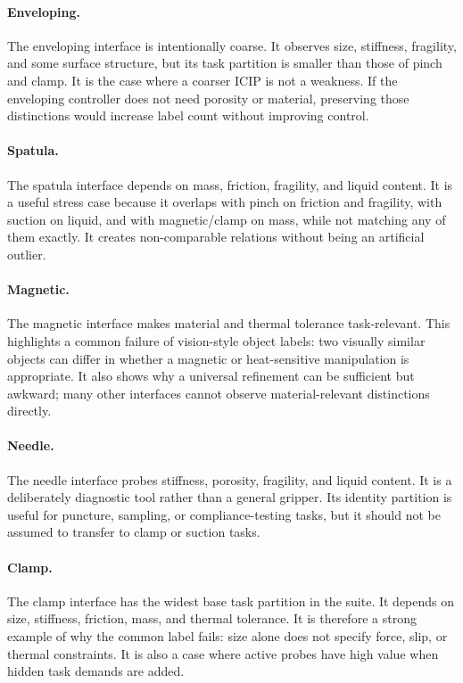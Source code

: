\documentclass{article}
\newcommand{\icip}{\textsc{ICIP}}
\begin{document}
\paragraph{Enveloping.}
The enveloping interface is intentionally coarse.
It observes size, stiffness, fragility, and some surface structure, but its task partition is smaller than those of pinch and clamp.
It is the case where a coarser \icip{} is not a weakness.
If the enveloping controller does not need porosity or material, preserving those distinctions would increase label count without improving control.

\paragraph{Spatula.}
The spatula interface depends on mass, friction, fragility, and liquid content.
It is a useful stress case because it overlaps with pinch on friction and fragility, with suction on liquid, and with magnetic/clamp on mass, while not matching any of them exactly.
It creates non-comparable relations without being an artificial outlier.

\paragraph{Magnetic.}
The magnetic interface makes material and thermal tolerance task-relevant.
This highlights a common failure of vision-style object labels: two visually similar objects can differ in whether a magnetic or heat-sensitive manipulation is appropriate.
It also shows why a universal refinement can be sufficient but awkward; many other interfaces cannot observe material-relevant distinctions directly.

\paragraph{Needle.}
The needle interface probes stiffness, porosity, fragility, and liquid content.
It is a deliberately diagnostic tool rather than a general gripper.
Its identity partition is useful for puncture, sampling, or compliance-testing tasks, but it should not be assumed to transfer to clamp or suction tasks.

\paragraph{Clamp.}
The clamp interface has the widest base task partition in the suite.
It depends on size, stiffness, friction, mass, and thermal tolerance.
It is therefore a strong example of why the common label fails: size alone does not specify force, slip, or thermal constraints.
It is also a case where active probes have high value when hidden task demands are added.
\end{document}

